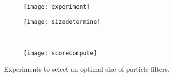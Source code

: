 \begin{figure}[h]
\centering
  \begin{subfigure}{0.32\textwidth}
  \texttt{[image: experiment]}
  \caption{}
  \label{fig:experiment}
  \end{subfigure}
  \begin{subfigure}{0.32\textwidth}
  \texttt{[image: sizedetermine]}
  \caption{}
  \label{fig:sizedeter}
  \end{subfigure}
  ~
  \begin{subfigure}{0.32\textwidth}
  \texttt{[image: scorecompute]}
  \caption{}
  \label{fig:scorecompute}
  \end{subfigure}
  \caption{Experiments to select an optimal size of particle filters.}
\end{figure} 


\FloatBarrier
